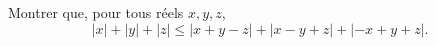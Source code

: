 Montrer que, pour tous réels $x, y, z$,
\[ |x| + |y| + |z| \leq |x + y - z| + |x - y + z| + |-x + y + z|. \]
